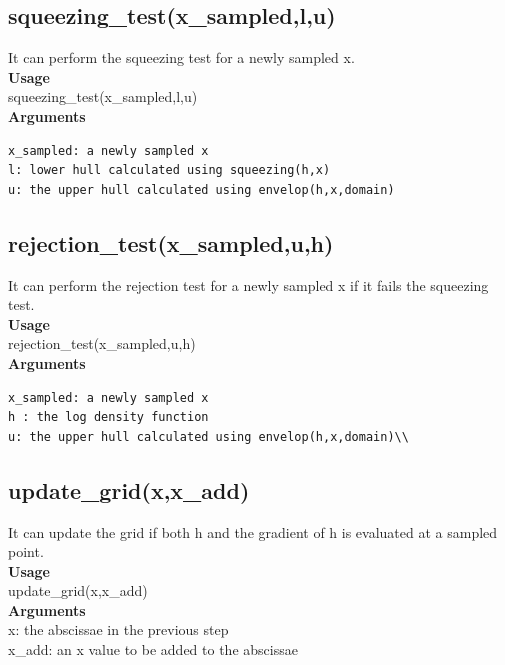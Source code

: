 \documentclass{llncs}\usepackage[]{graphicx}\usepackage[]{color}
\begin{document}
\subsection{squeezing\_test(x\_sampled,l,u)}
It can perform the squeezing test for a newly sampled x.\\
\textbf{Usage}\\
squeezing\_test(x\_sampled,l,u)\\
\textbf{Arguments}\\
\begin{verbatim}
x_sampled: a newly sampled x
l: lower hull calculated using squeezing(h,x)
u: the upper hull calculated using envelop(h,x,domain)
\end{verbatim}
\subsection{rejection\_test(x\_sampled,u,h)}
It can perform the rejection test for a newly sampled x if it fails the squeezing test.\\
\textbf{Usage}\\
rejection\_test(x\_sampled,u,h) \\
\textbf{Arguments}\\
\begin{verbatim}
x_sampled: a newly sampled x
h : the log density function
u: the upper hull calculated using envelop(h,x,domain)\\
\end{verbatim}
\subsection{update\_grid(x,x\_add)}
It can update the grid if both h and the gradient of h is evaluated at a sampled point.\\
\textbf{Usage}\\
update\_grid(x,x\_add)\\
\textbf{Arguments}\\
x: the abscissae in the previous step\\
x\_add: an x value to be added to the abscissae\\
\end{document}
